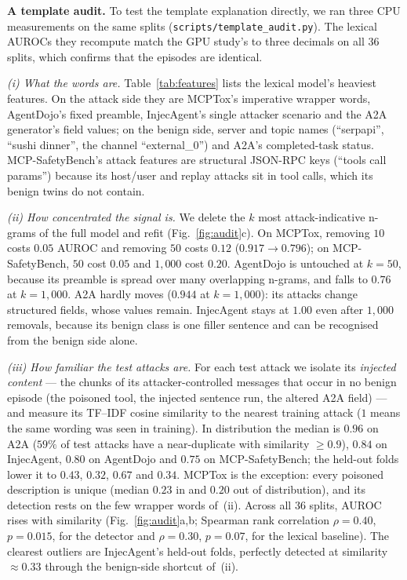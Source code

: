 \documentclass[conference,compsoc]{IEEEtran}
\begin{document}
\textbf{A template audit.} To test the template explanation directly, we ran three CPU measurements on the same splits (\texttt{scripts/template\_audit.py}). The lexical AUROCs they recompute match the GPU study's to three decimals on all 36 splits, which confirms that the episodes are identical.

\emph{(i) What the words are.} Table~\ref{tab:features} lists the lexical model's heaviest features. On the attack side they are MCPTox's imperative wrapper words, AgentDojo's fixed preamble, InjecAgent's single attacker scenario and the A2A generator's field values; on the benign side, server and topic names (``serpapi'', ``sushi dinner'', the channel ``external\_0'') and A2A's completed-task status. MCP-SafetyBench's attack features are structural JSON-RPC keys (``tools call params'') because its host/user and replay attacks sit in tool calls, which its benign twins do not contain.

\emph{(ii) How concentrated the signal is.} We delete the $k$ most attack-indicative n-grams of the full model and refit (Fig.~\ref{fig:audit}c). On MCPTox, removing $10$ costs $0.05$ AUROC and removing $50$ costs $0.12$ ($0.917\to0.796$); on MCP-SafetyBench, $50$ cost $0.05$ and $1{,}000$ cost $0.20$. AgentDojo is untouched at $k=50$, because its preamble is spread over many overlapping n-grams, and falls to $0.76$ at $k=1{,}000$. A2A hardly moves ($0.944$ at $k=1{,}000$): its attacks change structured fields, whose values remain. InjecAgent stays at $1.00$ even after $1{,}000$ removals, because its benign class is one filler sentence and can be recognised from the benign side alone.

\emph{(iii) How familiar the test attacks are.} For each test attack we isolate its \emph{injected content} --- the chunks of its attacker-controlled messages that occur in no benign episode (the poisoned tool, the injected sentence run, the altered A2A field) --- and measure its TF--IDF cosine similarity to the nearest training attack ($1$ means the same wording was seen in training). In distribution the median is $0.96$ on A2A ($59\%$ of test attacks have a near-duplicate with similarity $\ge0.9$), $0.84$ on InjecAgent, $0.80$ on AgentDojo and $0.75$ on MCP-SafetyBench; the held-out folds lower it to $0.43$, $0.32$, $0.67$ and $0.34$. MCPTox is the exception: every poisoned description is unique (median $0.23$ in and $0.20$ out of distribution), and its detection rests on the few wrapper words of~(ii). Across all 36 splits, AUROC rises with similarity (Fig.~\ref{fig:audit}a,b; Spearman rank correlation $\rho=0.40$, $p=0.015$, for the detector and $\rho=0.30$, $p=0.07$, for the lexical baseline). The clearest outliers are InjecAgent's held-out folds, perfectly detected at similarity $\approx0.33$ through the benign-side shortcut of~(ii).
\end{document}

